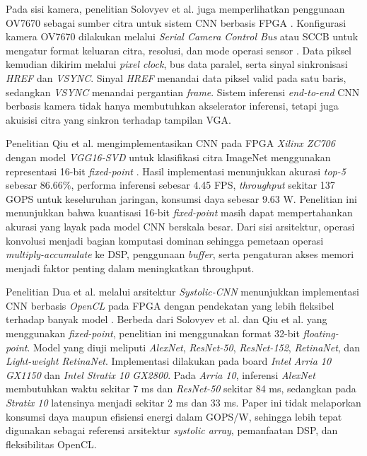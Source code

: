     Pada sisi kamera, penelitian Solovyev et al. juga memperlihatkan
    penggunaan OV7670 sebagai sumber citra untuk sistem CNN berbasis
    FPGA \cite{Solovyev2019FixedPointCNN}. Konfigurasi kamera OV7670
    dilakukan melalui \emph{Serial Camera Control Bus} atau SCCB untuk
    mengatur format keluaran citra, resolusi, dan mode operasi sensor
    \cite{OmniVision2006OV7670}. Data piksel kemudian dikirim melalui
    \emph{pixel clock}, bus data paralel, serta sinyal sinkronisasi
    \emph{HREF} dan \emph{VSYNC}. Sinyal \emph{HREF} menandai data piksel
    valid pada satu baris, sedangkan \emph{VSYNC} menandai pergantian
    \emph{frame}. Sistem inferensi \emph{end-to-end} CNN berbasis kamera
    tidak hanya membutuhkan akselerator inferensi, tetapi juga akuisisi
    citra yang sinkron terhadap tampilan VGA.

    Penelitian Qiu et al. mengimplementasikan CNN pada FPGA
    \emph{Xilinx ZC706} dengan model \emph{VGG16-SVD} untuk klasifikasi
    citra ImageNet menggunakan representasi 16-bit \emph{fixed-point}
    \cite{Qiu2016GoingDeeperFPGA}. Hasil implementasi menunjukkan akurasi
    \emph{top-5} sebesar $86.66\%$, performa inferensi sebesar 4.45 FPS,
    \emph{throughput} sekitar 137 GOPS untuk keseluruhan jaringan, konsumsi
    daya sebesar 9.63 W. Penelitian ini menunjukkan bahwa kuantisasi 16-bit
    \emph{fixed-point} masih dapat mempertahankan akurasi yang layak pada
    model CNN berskala besar. Dari sisi arsitektur, operasi konvolusi
    menjadi bagian komputasi dominan sehingga pemetaan operasi
    \emph{multiply-accumulate} ke DSP, penggunaan \emph{buffer}, serta
    pengaturan akses memori menjadi faktor penting dalam meningkatkan
    throughput.

    Penelitian Dua et al. melalui arsitektur \emph{Systolic-CNN} menunjukkan
    implementasi CNN berbasis \emph{OpenCL} pada FPGA dengan pendekatan
    yang lebih fleksibel terhadap banyak model \cite{Dua2020SystolicCNN}.
    Berbeda dari Solovyev et al. dan Qiu et al. yang menggunakan
    \emph{fixed-point}, penelitian ini menggunakan format 32-bit
    \emph{floating-point}. Model yang diuji meliputi \emph{AlexNet},
    \emph{ResNet-50}, \emph{ResNet-152}, \emph{RetinaNet}, dan
    \emph{Light-weight RetinaNet}. Implementasi dilakukan pada board
    \emph{Intel Arria 10 GX1150} dan \emph{Intel Stratix 10 GX2800}.
    Pada \emph{Arria 10}, inferensi \emph{AlexNet} membutuhkan waktu
    sekitar 7 ms dan \emph{ResNet-50} sekitar 84 ms, sedangkan pada
    \emph{Stratix 10} latensinya menjadi sekitar 2 ms dan 33 ms.
    Paper ini tidak melaporkan konsumsi daya maupun efisiensi energi dalam
    GOPS/W, sehingga lebih tepat digunakan sebagai referensi arsitektur
    \emph{systolic array}, pemanfaatan DSP, dan fleksibilitas OpenCL.

